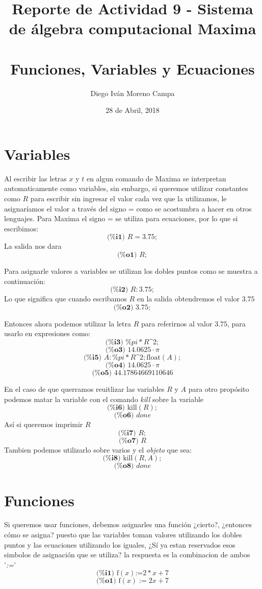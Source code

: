 \documentclass{article}
\title{Reporte de Actividad 9 - Sistema de álgebra computacional Maxima ~\\ Funciones, Variables y Ecuaciones}
\author{Diego Iván Moreno Campa}
\date{28 de Abril, 2018}
\begin{document}
\maketitle

\bigskip

\section{Variables}

Al escribir las letras $x$ y $t$ en algun comando de Maxima se interpretan automaticamente como variables, sin embargo, si queremos utilizar constantes como $R$ para escribir sin ingresar el valor cada vez que la utilizamos, le asignaríamos el valor a través del signo = como se acostumbra a hacer en otros lenguajes. Para Maxima el signo = se utiliza para ecuaciones, por lo que si escribimos:
\[ \textbf{(\%i1) }R=3.75; \]
La salida nos dara
\[ \textbf{(\%o1) }R; \]

Para asignarle valores a variables se utilizan los dobles puntos como se muestra a continuación:
\[ \textbf{(\%i2) }R:3.75; \]
Lo que significa que cuando escribamos $R$ en la salida obtendremos el valor $3.75$
\[ \textbf{(\%o2) }3.75; \]

Entonces ahora podemos utilizar la letra $R$ para referirnos al valor $3.75$, para usarlo en expresiones como:
\[ \textbf{(\%i3) }\%pi*R\text{\textasciicircum}2; \]
\[ \textbf{(\%o3) }14.0625\cdot\pi \]
\[ \textbf{(\%i5) }A:\%pi*R\text{\textasciicircum}2; \text{float}(A); \]
\[ \textbf{(\%o4) }14.0625\cdot\pi \]
\[ \textbf{(\%o5) }44.17864669110646 \]

\newpage

En el caso de que querramos reuitlizar las variables $R$ y $A$ para otro propósito podemos matar la variable con el comando \textit{kill} sobre la variable
\[ \textbf{(\%i6) }\text{kill}(R); \]
\[ \textbf{(\%o6) }done \]
Así si queremos imprimir $R$
\[ \textbf{(\%i7) }R; \]
\[ \textbf{(\%o7) }R \]
Tambien podemos utilizarlo sobre varios y el \textit{objeto} que sea:
\[ \textbf{(\%i8) }\text{kill}(R,A); \]
\[ \textbf{(\%o8) }done \]

\section{Funciones}

Si queremos usar funciones, debemos asignarles una función ¿cierto?, ¿entonces cómo se asigna? puesto que las variables toman valores utilizando los dobles puntos y las ecuaciones utilizando los iguales, ¿Sí ya estan reservados esos simbolos de asignación que se utiliza? la respuesta es la combinacion de ambos '\textit{:=}'
\[ \textbf{(\%i1) }\text{f}(x)\text{:=}2*x+7 \]
\[ \textbf{(\%o1) }\text{f}(x):=2x+7 \]
\end{document}
